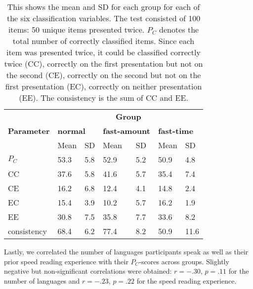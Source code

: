 \begin{table}[h]
\centering
\begin{tabular}{lllllll}
\toprule
& \multicolumn{6}{c}{\textbf{Group}} \\
\cmidrule{2-7}
\textbf{Parameter} & \multicolumn{2}{l}{\textbf{normal}} & \multicolumn{2}{l}{\textbf{fast-amount}} & \multicolumn{2}{l}{\textbf{fast-time}} \\
\midrule
 	    & Mean                       & SD                              & Mean & SD  & Mean & SD \\
\cmidrule(lr{.75em}){2-3}\cmidrule(lr{.75em}){4-5}\cmidrule(lr{.75em}){6-7}
$P_{C}$ & 53.3                       & 5.8                             & 52.9 & 5.2 & 50.9 & 4.8 \\
CC	    & 37.6                       & 5.8                             & 41.6 & 5.7 & 35.4 & 7.4 \\
CE 	    & 16.2                       & 6.8                             & 12.4 & 4.1 & 14.8 & 2.4 \\
EC	    & 15.4                       & 3.9                             & 10.2 & 5.7 & 16.2 & 1.9 \\
EE	    & 30.8                       & 7.5                             & 35.8 & 7.7 & 33.6 & 8.2 \\
consistency & 68.4                   & 6.2                             & 77.4 & 8.2 & 50.9 & 11.6\\
\bottomrule
\end{tabular}
\caption{This shows the mean and SD for each group for each of the six classification variables. The test consisted of 100 items: 50 unique items presented twice. $P_C$ denotes the total number of correctly classified items. Since each item was presented twice, it could be classified correctly twice (CC), correctly on the first presentation but not on the second (CE), correctly on the second but not on the first presentation (EC), correctly on neither presentation (EE). The consistency is the sum of CC and EE.}
\label{table2}
\end{table}
Lastly, we correlated the number of languages participants speak as well as their prior speed reading experience with their $P_C$-scores across groups. Slightly negative but non-significant correlations were obtained: $r=-.30$, $p=.11$ for the number of languages and $r=-.23$, $p=.22$ for the speed reading experience.